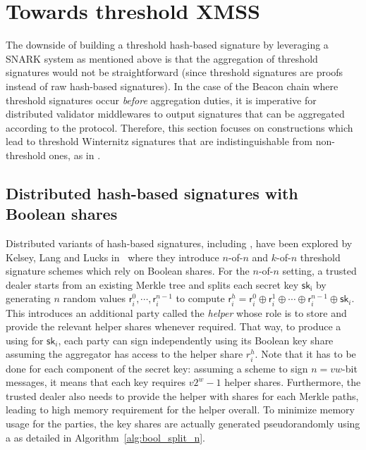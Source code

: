 \section{Towards threshold XMSS}
The downside of building a threshold hash-based signature by leveraging a SNARK system as mentioned above is that the aggregation of threshold signatures would not be straightforward (since threshold signatures are proofs instead of raw hash-based signatures).
In the case of the Beacon chain where threshold signatures occur \textit{before} aggregation duties, it is imperative for distributed validator middlewares to output signatures that can be aggregated according to the protocol.
Therefore, this section focuses on constructions which lead to threshold Winternitz signatures that are indistinguishable from non-threshold ones, as in \BLS.
\subsection{Distributed hash-based signatures with Boolean shares}
Distributed variants of hash-based signatures, including \XMSS, have been explored by Kelsey, Lang and Lucks in~\cite{cryptoeprint:2022/241} where they introduce $n$-of-$n$ and $k$-of-$n$ threshold signature schemes which rely on Boolean shares.
For the $n$-of-$n$ setting, a trusted dealer starts from an existing Merkle tree and splits each \WOTS secret key $\mathsf{sk_i}$ by generating $n$ random values $\mathsf{r}^0_i,\cdots,\mathsf{r}^{n-1}_i$ to compute $\mathsf{r}^h_i = \mathsf{r}^0_i \oplus \mathsf{r}^1_i \oplus \cdots \oplus \mathsf{r}^{n-1}_i \oplus \mathsf{sk}_i$.
This introduces an additional party called the \textit{helper} whose role is to store and provide the relevant helper shares whenever required.
That way, to produce a \WOTS using for $\mathsf{sk}_i$, each party can sign independently using its Boolean key share assuming the aggregator has access to the helper share $r^h_i$.
Note that it has to be done for each component of the secret key: assuming a \WOTS scheme to sign $n=vw$-bit messages, it means that each \WOTS key requires $v2^w-1$ helper shares.
Furthermore, the trusted dealer also needs to provide the helper with  shares for each Merkle paths, leading to high memory requirement for the helper overall.
To minimize memory usage for the parties, the key shares are actually generated pseudorandomly using a \PRF as detailed in Algorithm~\ref{alg:bool_split_n}.

